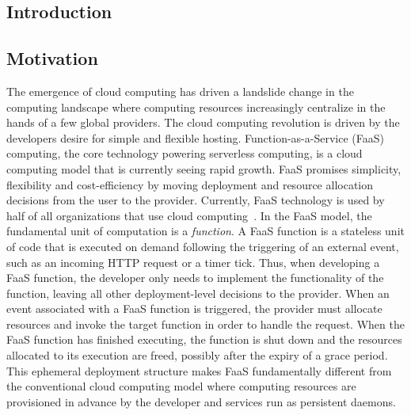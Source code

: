 \documentclass[../main.tex]{subfiles}
\begin{document}
\ifx\chapincluded\undefined
  \begin{refsection}
 \fi


\chapter{Introduction}
\label{chap:intro}

\section{Motivation}

The emergence of cloud computing has driven a landslide change in the
computing landscape where computing resources increasingly centralize
in the hands of a few global providers. The cloud computing revolution
is driven by the developers desire for simple and flexible
hosting. Function-as-a-Service (FaaS) computing, the core technology
powering serverless computing, is a cloud computing model that is
currently seeing rapid growth. FaaS promises simplicity, flexibility
and cost-efficiency by moving deployment and resource allocation
decisions from the user to the provider. Currently, FaaS technology is
used by half of all organizations that use cloud
computing~\cite{serverless_state}. In the FaaS model, the fundamental
unit of computation is a \emph{function}. A FaaS function is a
stateless unit of code that is executed on demand following the
triggering of an external event, such as an incoming HTTP request or a
timer tick. Thus, when developing a FaaS function, the developer only
needs to implement the functionality of the function, leaving all
other deployment-level decisions to the provider.
When an event associated with a FaaS function is triggered,
the provider must allocate resources and invoke the target function in
order to handle the request. When the FaaS function has finished
executing, the function is shut down and the resources allocated to
its execution are freed, possibly after the expiry of a grace
period. This ephemeral deployment structure makes FaaS fundamentally
different from the conventional cloud computing model where computing
resources are provisioned in advance by the developer and services run
as persistent daemons.


\end{refsection}
\end{document}

